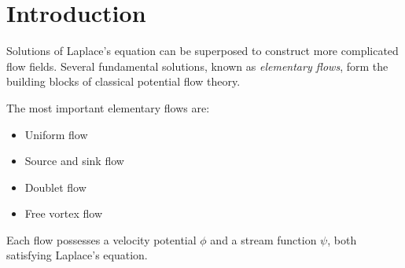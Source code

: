\section{Introduction}
\label{sec:introduction}

Solutions of Laplace's equation can be superposed to construct more
complicated flow fields.
Several fundamental solutions, known as \emph{elementary flows}, form
the building blocks of classical potential flow theory.

The most important elementary flows are:

\begin{itemize}
    \item Uniform flow
    \item Source and sink flow
    \item Doublet flow
    \item Free vortex flow
\end{itemize}

Each flow possesses a velocity potential $\phi$ and a stream function
$\psi$, both satisfying Laplace's equation.
